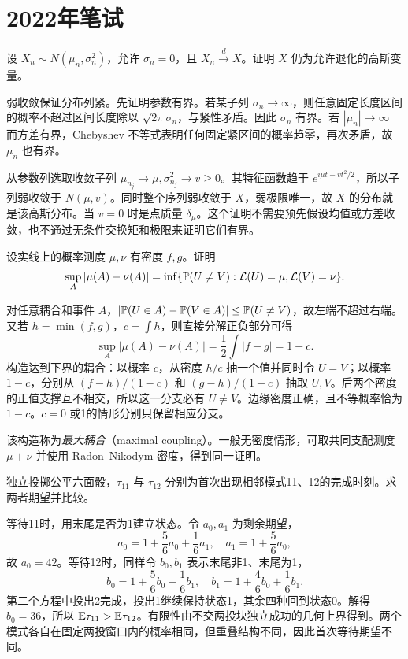 \section{2022年笔试}
\begin{example}[原题1：高斯分布族对弱极限封闭]\label{yau:2022-1}
设 $X_n\sim N(\mu_n,\sigma_n^2)$，允许 $\sigma_n=0$，且 $X_n\xrightarrow dX$。证明 $X$ 仍为允许退化的高斯变量。
\end{example}
\begin{solve}
弱收敛保证分布列紧。先证明参数有界。若某子列 $\sigma_n\to\infty$，则任意固定长度区间的概率不超过区间长度除以 $\sqrt{2\pi}\sigma_n$，与紧性矛盾。因此 $\sigma_n$ 有界。若 $|\mu_n|\to\infty$ 而方差有界，Chebyshev 不等式表明任何固定紧区间的概率趋零，再次矛盾，故 $\mu_n$ 也有界。

从参数列选取收敛子列 $\mu_{n_j}\to\mu,\sigma_{n_j}^2\to v\ge0$。其特征函数趋于 $e^{i\mu t-vt^2/2}$，所以子列弱收敛于 $N(\mu,v)$。同时整个序列弱收敛于 $X$，弱极限唯一，故 $X$ 的分布就是该高斯分布。当 $v=0$ 时是点质量 $\delta_\mu$。这个证明不需要预先假设均值或方差收敛，也不通过无条件交换矩和极限来证明它们有界。
\end{solve}

\begin{example}[原题2：全变差距离的最大耦合表示]\label{yau:2022-2}
设实线上的概率测度 $\mu,\nu$ 有密度 $f,g$。证明
\[
\sup_A|\mu(A)-\nu(A)|=\inf\{\mathbb P(U\ne V):\mathcal L(U)=\mu,\mathcal L(V)=\nu\}.
\]
\end{example}
\begin{solve}
对任意耦合和事件 $A$，$|\mathbb P(U\in A)-\mathbb P(V\in A)|\le\mathbb P(U\ne V)$，故左端不超过右端。又若 $h=\min(f,g)$，$c=\int h$，则直接分解正负部分可得
\[
\sup_A|\mu(A)-\nu(A)|=\frac12\int|f-g|=1-c.
\]
构造达到下界的耦合：以概率 $c$，从密度 $h/c$ 抽一个值并同时令 $U=V$；以概率 $1-c$，分别从 $(f-h)/(1-c)$ 和 $(g-h)/(1-c)$ 抽取 $U,V$。后两个密度的正值支撑互不相交，所以这一分支必有 $U\ne V$。边缘密度正确，且不等概率恰为 $1-c$。$c=0$ 或1的情形分别只保留相应分支。

该构造称为\emph{最大耦合}（maximal coupling）。一般无密度情形，可取共同支配测度 $\mu+\nu$ 并使用 Radon--Nikodym 密度，得到同一证明。
\end{solve}

\begin{example}\label{yau:2022-3}
独立投掷公平六面骰，$\tau_{11}$ 与 $\tau_{12}$ 分别为首次出现相邻模式11、12的完成时刻。求两者期望并比较。
\end{example}
\begin{solve}
等待11时，用末尾是否为1建立状态。令 $a_0,a_1$ 为剩余期望，
\[
a_0=1+\frac56a_0+\frac16a_1,\quad a_1=1+\frac56a_0,
\]
故 $a_0=42$。等待12时，同样令 $b_0,b_1$ 表示末尾非1、末尾为1，
\[
b_0=1+\frac56b_0+\frac16b_1,\quad b_1=1+\frac46b_0+\frac16b_1.
\]
第二个方程中投出2完成，投出1继续保持状态1，其余四种回到状态0。解得 $b_0=36$，所以 $\mathbb E\tau_{11}>\mathbb E\tau_{12}$。有限性由不交两投块独立成功的几何上界得到。两个模式各自在固定两投窗口内的概率相同，但重叠结构不同，因此首次等待期望不同。
\end{solve}

